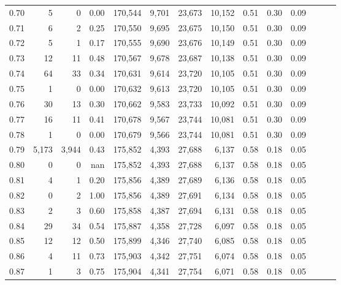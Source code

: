 \begin{tabular}{rrrrrrrrrrrrrr}
0.70 &       5 &      0 &  0.00 &  170,544 &    9,701 &  23,673 &  10,152 &  0.51 &  0.30 &      0.09 \\
0.71 &       6 &      2 &  0.25 &  170,550 &    9,695 &  23,675 &  10,150 &  0.51 &  0.30 &      0.09 \\
0.72 &       5 &      1 &  0.17 &  170,555 &    9,690 &  23,676 &  10,149 &  0.51 &  0.30 &      0.09 \\
0.73 &      12 &     11 &  0.48 &  170,567 &    9,678 &  23,687 &  10,138 &  0.51 &  0.30 &      0.09 \\
0.74 &      64 &     33 &  0.34 &  170,631 &    9,614 &  23,720 &  10,105 &  0.51 &  0.30 &      0.09 \\
0.75 &       1 &      0 &  0.00 &  170,632 &    9,613 &  23,720 &  10,105 &  0.51 &  0.30 &      0.09 \\
0.76 &      30 &     13 &  0.30 &  170,662 &    9,583 &  23,733 &  10,092 &  0.51 &  0.30 &      0.09 \\
0.77 &      16 &     11 &  0.41 &  170,678 &    9,567 &  23,744 &  10,081 &  0.51 &  0.30 &      0.09 \\
0.78 &       1 &      0 &  0.00 &  170,679 &    9,566 &  23,744 &  10,081 &  0.51 &  0.30 &      0.09 \\
0.79 &   5,173 &  3,944 &  0.43 &  175,852 &    4,393 &  27,688 &   6,137 &  0.58 &  0.18 &      0.05 \\
0.80 &       0 &      0 &   nan &  175,852 &    4,393 &  27,688 &   6,137 &  0.58 &  0.18 &      0.05 \\
0.81 &       4 &      1 &  0.20 &  175,856 &    4,389 &  27,689 &   6,136 &  0.58 &  0.18 &      0.05 \\
0.82 &       0 &      2 &  1.00 &  175,856 &    4,389 &  27,691 &   6,134 &  0.58 &  0.18 &      0.05 \\
0.83 &       2 &      3 &  0.60 &  175,858 &    4,387 &  27,694 &   6,131 &  0.58 &  0.18 &      0.05 \\
0.84 &      29 &     34 &  0.54 &  175,887 &    4,358 &  27,728 &   6,097 &  0.58 &  0.18 &      0.05 \\
0.85 &      12 &     12 &  0.50 &  175,899 &    4,346 &  27,740 &   6,085 &  0.58 &  0.18 &      0.05 \\
0.86 &       4 &     11 &  0.73 &  175,903 &    4,342 &  27,751 &   6,074 &  0.58 &  0.18 &      0.05 \\
0.87 &       1 &      3 &  0.75 &  175,904 &    4,341 &  27,754 &   6,071 &  0.58 &  0.18 &      0.05 \\

\end{tabular}
